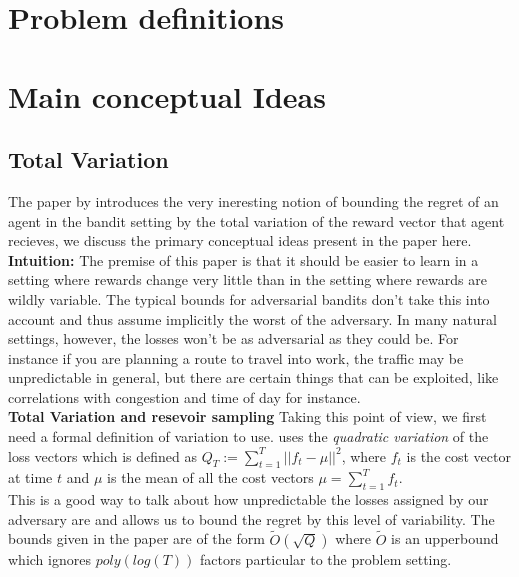 \section{Problem definitions}



\section{Main conceptual Ideas}
\subsection{Total Variation }
The paper by \citep{hazan} introduces the very ineresting notion of bounding
the regret of an agent in the bandit setting by the total variation of the reward vector 
that agent recieves, we discuss the primary conceptual ideas present in the paper here. \\

\textbf{Intuition:}
The premise of this paper is that it should be easier to learn in a setting where
rewards change very little than in the setting where rewards are wildly variable. 
The typical bounds for adversarial bandits don't take this into account and thus assume implicitly the 
worst of the adversary. In many natural settings, however, the losses won't be as adversarial as they could be. For
instance if you are planning a route to travel into work, the traffic may be unpredictable in general, but there 
are certain things that can be exploited, like correlations with congestion and time of day for instance.\\

\textbf{Total Variation and resevoir sampling}
Taking this point of view, we first need a formal definition of variation to use.  \citep{hazan} uses the
\textit{quadratic variation} of the loss vectors  which is defined as $Q_T := \sum_{t=1}^T || f_t - \mu ||^2$,
where $f_t$ is the cost vector at time $t$ and $\mu$ is the mean of all the cost vectors
$\mu = \sum_{t=1}^T f_t$. \\

This is a good  way to talk about how unpredictable the losses assigned by our adversary are and allows us to bound the
regret by this level of variability. The bounds given in the paper are of the form
$\tilde{O}(\sqrt{Q})$ where $\tilde{O}$ is an upperbound which ignores $poly(log(T))$ factors
particular to the problem setting. \\

